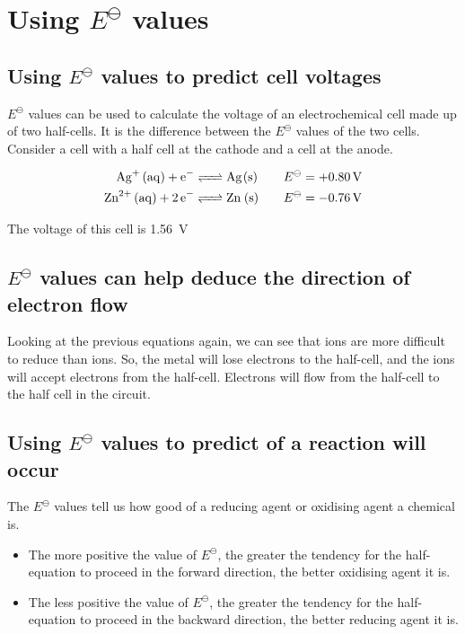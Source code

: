 \documentclass{scrbook}
\begin{document}
\section{Using $E^\ominus$ values}

\subsection{Using $E^\ominus$ values to predict cell voltages}

	$E^\ominus$ values can be used to calculate the voltage of an electrochemical cell made up of two half-cells. It is the difference between the $E^\ominus$ values of the two cells. Consider a cell with a  half cell at the cathode and a  cell at the anode.

	\begin{align*}
		\ce{ Ag+ (aq) + e- &<=> Ag(s) } && &E^\ominus &= \SI[explicit-sign=+]{0.80}{\volt} \\
		\ce{ Zn^{2+} (aq) +2e- &<=> Zn (s) } && &E^\ominus &= \SI[explicit-sign=+]{-0.76}{\volt}
	\end{align*}

	The voltage of this cell is \SI{1.56}{\volt}

\subsection{$E^\ominus$ values can help deduce the direction of electron flow}

	Looking at the previous equations again, we can see that  ions are more difficult to reduce than  ions. So, the  metal will lose electrons to the  half-cell, and the  ions will accept electrons from the  half-cell. Electrons will flow from the  half-cell to the  half cell in the circuit.

\subsection{Using $E^\ominus$ values to predict of a reaction will occur}

	The $E^\ominus$ values tell us how good of a reducing agent or oxidising agent a chemical is.

	\begin{itemize}
		\item
			The more positive the value of $E^\ominus$, the greater the tendency for the half-equation to proceed in the forward direction, the better oxidising agent it is.
		\item
			The less positive the value of $E^\ominus$, the greater the tendency for the half-equation to proceed in the backward direction, the better reducing agent it is.
	\end{itemize}
\end{document}
